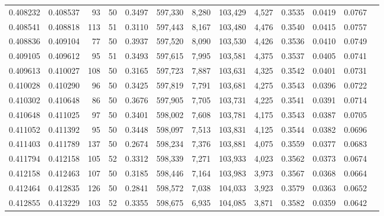\begin{tabular}{rrrrrrrrrrrrr}
0.408232 & 0.408537 &    93 &  50 &                                     0.3497 & 597,330 &   8,280 & 103,429 &   4,527 & 0.3535 & 0.0419 & 0.0767 \\
0.408541 & 0.408818 &   113 &  51 &                                     0.3110 & 597,443 &   8,167 & 103,480 &   4,476 & 0.3540 & 0.0415 & 0.0757 \\
0.408836 & 0.409104 &    77 &  50 &                                     0.3937 & 597,520 &   8,090 & 103,530 &   4,426 & 0.3536 & 0.0410 & 0.0749 \\
0.409105 & 0.409612 &    95 &  51 &                                     0.3493 & 597,615 &   7,995 & 103,581 &   4,375 & 0.3537 & 0.0405 & 0.0741 \\
0.409613 & 0.410027 &   108 &  50 &                                     0.3165 & 597,723 &   7,887 & 103,631 &   4,325 & 0.3542 & 0.0401 & 0.0731 \\
0.410028 & 0.410290 &    96 &  50 &                                     0.3425 & 597,819 &   7,791 & 103,681 &   4,275 & 0.3543 & 0.0396 & 0.0722 \\
0.410302 & 0.410648 &    86 &  50 &                                     0.3676 & 597,905 &   7,705 & 103,731 &   4,225 & 0.3541 & 0.0391 & 0.0714 \\
0.410648 & 0.411025 &    97 &  50 &                                     0.3401 & 598,002 &   7,608 & 103,781 &   4,175 & 0.3543 & 0.0387 & 0.0705 \\
0.411052 & 0.411392 &    95 &  50 &                                     0.3448 & 598,097 &   7,513 & 103,831 &   4,125 & 0.3544 & 0.0382 & 0.0696 \\
0.411403 & 0.411789 &   137 &  50 &                                     0.2674 & 598,234 &   7,376 & 103,881 &   4,075 & 0.3559 & 0.0377 & 0.0683 \\
0.411794 & 0.412158 &   105 &  52 &                                     0.3312 & 598,339 &   7,271 & 103,933 &   4,023 & 0.3562 & 0.0373 & 0.0674 \\
0.412158 & 0.412463 &   107 &  50 &                                     0.3185 & 598,446 &   7,164 & 103,983 &   3,973 & 0.3567 & 0.0368 & 0.0664 \\
0.412464 & 0.412835 &   126 &  50 &                                     0.2841 & 598,572 &   7,038 & 104,033 &   3,923 & 0.3579 & 0.0363 & 0.0652 \\
0.412855 & 0.413229 &   103 &  52 &                                     0.3355 & 598,675 &   6,935 & 104,085 &   3,871 & 0.3582 & 0.0359 & 0.0642 \\

\end{tabular}
